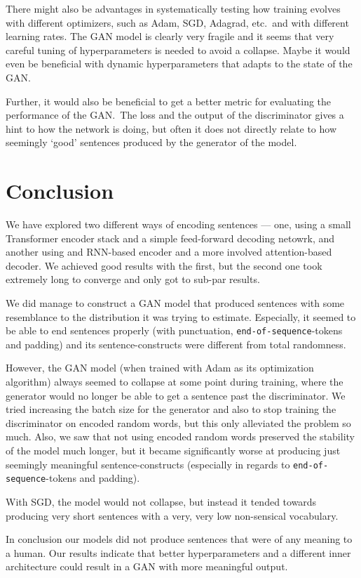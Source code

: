 \documentclass{article}
\begin{document}
There might also be advantages in systematically testing how training evolves
with different optimizers, such as Adam, SGD, Adagrad, etc.\ and with different
learning rates. The GAN model is clearly very fragile and it seems that very
careful tuning of hyperparameters is needed to avoid a collapse. Maybe it would
even be beneficial with dynamic hyperparameters that adapts to the state of the
GAN.\

Further, it would also be beneficial to get a better metric for evaluating the
performance of the GAN.\ The loss and the output of the discriminator gives a
hint to how the network is doing, but often it does not directly relate to how
seemingly `good' sentences produced by the generator of the model.

\section{Conclusion}\label{sec:conclusion}
We have explored two different ways of encoding sentences --- one, using a small
Transformer encoder stack and a simple feed-forward decoding netowrk, and
another using and RNN-based encoder and a more involved attention-based decoder.
We achieved good results with the first, but the second one took extremely long
to converge and only got to sub-par results.

We did manage to construct a GAN model that produced sentences with some
resemblance to the distribution it was trying to estimate. Especially, it seemed
to be able to end sentences properly (with punctuation,
\texttt{end-of-sequence}-tokens and padding) and its sentence-constructs were
different from total randomness.

However, the GAN model (when trained with Adam as its optimization algorithm)
always seemed to collapse at some point during training, where the generator
would no longer be able to get a sentence past the discriminator. We tried
increasing the batch size for the generator and also to stop training the
discriminator on encoded random words, but this only alleviated the problem so
much. Also, we saw that not using encoded random words preserved the stability
of the model much longer, but it became significantly worse at producing just
seemingly meaningful sentence-constructs (especially in regards to
\texttt{end-of-sequence}-tokens and padding).

With SGD, the model would not collapse, but instead it tended towards producing
very short sentences with a very, very low non-sensical vocabulary.

In conclusion our models did not produce sentences that were of any meaning to a human.
Our results indicate that better hyperparameters and a different inner architecture could
result in a GAN with more meaningful output.

\newpage
\printbibliography%
\end{document}
